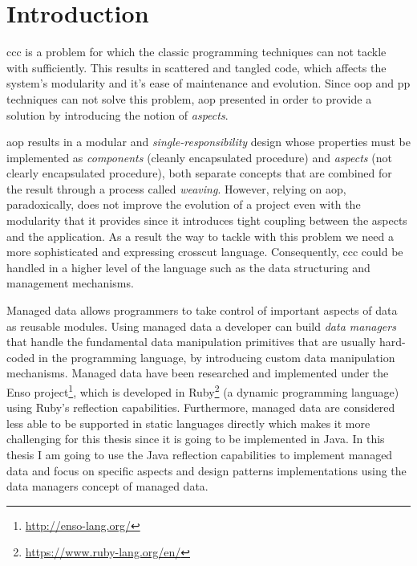 \chapter{Introduction}\label{Introduction}
\ac{ccc} is a problem for which the classic programming techniques can not tackle with sufficiently. 
This results in scattered and tangled code, which affects the system's modularity and it's ease of maintenance and evolution. 
Since \ac{oop} and \ac{pp} techniques can not solve this problem, \ac{aop} presented \cite{kiczales1997aspect} in order to
provide a solution by introducing the notion of \textit{aspects}.

\ac{aop} results in a modular and \textit{single-responsibility} design whose properties must be implemented as \textit{components} (cleanly encapsulated procedure) and \textit{aspects} (not clearly encapsulated procedure), both separate concepts that are combined for the result through a process called \textit{weaving}. 
However, relying on \ac{aop}, paradoxically, does not improve the evolution of a project even with the modularity that it provides 
since it introduces tight coupling between the aspects and the application. 
As a result the way to tackle with this problem we need a more sophisticated and expressing crosscut language.
Consequently, \ac{ccc} could be handled in a higher level of the language such as the data structuring and management mechanisms.

Managed data \cite{loh2012managed} allows programmers to take control of important aspects of data as reusable modules. 
Using managed data a developer can build \textit{data managers} that handle the fundamental data manipulation primitives 
that are usually hard-coded in the programming language, by introducing custom data manipulation mechanisms. 
Managed data have been researched and implemented under the Enso project\footnote{\label{note1}\url{http://enso-lang.org/}}, which is developed in Ruby\footnote{\label{note2}\url{https://www.ruby-lang.org/en/}} (a dynamic programming language) using Ruby’s reflection capabilities. 
Furthermore, managed data are considered less able to be supported in static languages directly which makes it more challenging for 
this thesis since it is going to be implemented in Java.
In this thesis I am going to use the Java reflection capabilities to implement managed data and focus on specific aspects and design patterns implementations using the data managers concept of managed data. 

